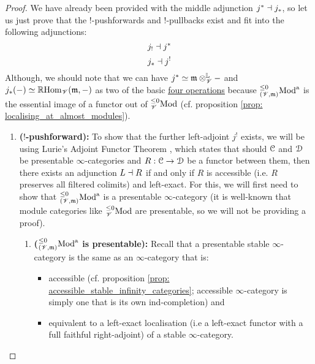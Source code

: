                         \begin{proof}
                            We have already been provided with the middle adjunction $j^* \dashv j_*$, so let us just prove that the $!$-pushforwards and $!$-pullbacks exist and fit into the following adjunctions:
                                $$j_! \dashv j^*$$
                                $$j_* \dashv j^!$$
                            Although, we should note that we can have $j^* \cong \m \tensor_{\scrV}^{\L} -$ and $j_*(-) \simeq \mathbb{R}\mathrm{Hom}_{\mathscr{V}}(\mathfrak{m}, -)$ as two of the basic \href{https://ncatlab.org/nlab/show/six+operations}{\underline{four operations}} because ${}_{(\mathscr{V}, \mathfrak{m})}^{\leq 0}\mathrm{Mod}^{\mathrm{a}}$ is the essential image of a functor out of ${}_{\mathscr{V}}^{\leq 0}\mathrm{Mod}$ (cf. proposition \ref{prop: localising_at_almost_modules}). 
                                \begin{enumerate}
                                    \item \textbf{($!$-pushforward):} To show that the further left-adjoint $j^!$ exists, we will be using Lurie's Adjoint Functor Theorem \cite[Corollary 5.5.2.9]{HTT}, which states that should $\mathcal{C}$ and $\mathcal{D}$ be presentable $\infty$-categories and $R: \mathcal{C} \to \mathcal{D}$ be a functor between them, then there exists an adjunction $L \dashv R$ if and only if $R$ is accessible (i.e. $R$ preserves all filtered colimits) and left-exact. For this, we will first need to show that ${}_{(\mathscr{V}, \mathfrak{m})}^{\leq 0}\mathrm{Mod}^{\mathrm{a}}$ is a presentable $\infty$-category (it is well-known that module categories like ${}_{\mathscr{V}}^{\leq 0}\mathrm{Mod}$ are presentable, so we will not be providing a proof).
                                        \begin{enumerate}
                                            \item \textbf{(${}_{(\mathscr{V}, \mathfrak{m})}^{\leq 0}\mathrm{Mod}^{\mathrm{a}}$ is presentable):} Recall that a presentable stable $\infty$-category is the same as an $\infty$-category that is:
                                                \begin{itemize}
                                                    \item accessible (cf. proposition \ref{prop: accessible_stable_infinity_categories}; accessible $\infty$-category is simply one that is its own ind-completion) and
                                                    \item equivalent to a left-exact localisation (i.e a left-exact functor with a full faithful right-adjoint) of a stable $\infty$-category.
                                                \end{itemize}  
                                                

\end{enumerate}
\end{enumerate}
\end{proof}
